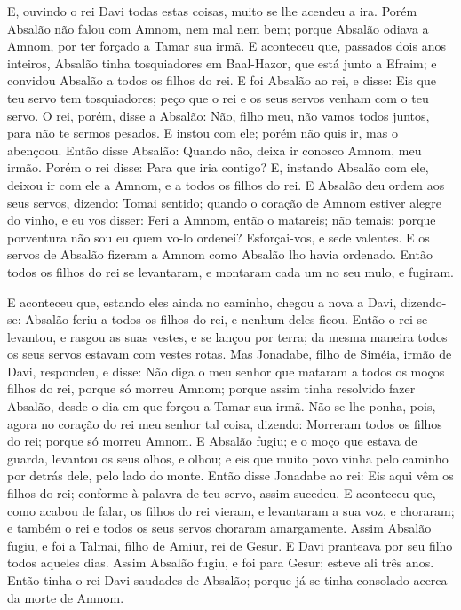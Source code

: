 E, ouvindo o rei Davi todas estas coisas, muito se lhe acendeu a
ira. Porém Absalão não falou com Amnom, nem mal nem bem;
porque Absalão odiava a Amnom, por ter forçado a Tamar sua irmã.
E aconteceu que, passados dois anos inteiros, Absalão tinha
tosquiadores em Baal-Hazor, que está junto a Efraim; e convidou
Absalão a todos os filhos do rei. E foi Absalão ao rei, e
disse: Eis que teu servo tem tosquiadores; peço que o rei e os seus
servos venham com o teu servo. O rei, porém, disse a Absalão:
Não, filho meu, não vamos todos juntos, para não te sermos pesados.
E instou com ele; porém não quis ir, mas o abençoou. Então
disse Absalão: Quando não, deixa ir conosco Amnom, meu irmão. Porém
o rei disse: Para que iria contigo? E, instando Absalão com
ele, deixou ir com ele a Amnom, e a todos os filhos do rei. E
Absalão deu ordem aos seus servos, dizendo: Tomai sentido; quando o
coração de Amnom estiver alegre do vinho, e eu vos disser: Feri a
Amnom, então o matareis; não temais: porque porventura não sou eu
quem vo-lo ordenei? Esforçai-vos, e sede valentes. E os
servos de Absalão fizeram a Amnom como Absalão lho havia ordenado.
Então todos os filhos do rei se levantaram, e montaram cada um no
seu mulo, e fugiram.

E aconteceu que, estando eles ainda no caminho, chegou a nova a
Davi, dizendo-se: Absalão feriu a todos os filhos do rei, e nenhum
deles ficou. Então o rei se levantou, e rasgou as suas
vestes, e se lançou por terra; da mesma maneira todos os seus servos
estavam com vestes rotas. Mas Jonadabe, filho de Siméia,
irmão de Davi, respondeu, e disse: Não diga o meu senhor que mataram
a todos os moços filhos do rei, porque só morreu Amnom; porque assim
tinha resolvido fazer Absalão, desde o dia em que forçou a Tamar sua
irmã. Não se lhe ponha, pois, agora no coração do rei meu
senhor tal coisa, dizendo: Morreram todos os filhos do rei; porque
só morreu Amnom. E Absalão fugiu; e o moço que estava de
guarda, levantou os seus olhos, e olhou; e eis que muito povo vinha
pelo caminho por detrás dele, pelo lado do monte. Então disse
Jonadabe ao rei: Eis aqui vêm os filhos do rei; conforme à palavra
de teu servo, assim sucedeu. E aconteceu que, como acabou de
falar, os filhos do rei vieram, e levantaram a sua voz, e choraram;
e também o rei e todos os seus servos choraram amargamente.
Assim Absalão fugiu, e foi a Talmai, filho de Amiur, rei de
Gesur. E Davi pranteava por seu filho todos aqueles dias.
Assim Absalão fugiu, e foi para Gesur; esteve ali três anos.
Então tinha o rei Davi saudades de Absalão; porque já se
tinha consolado acerca da morte de Amnom.

